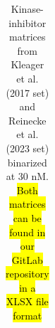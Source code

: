 \clearpage
\begin{table}[ht]
    \centering
    \caption{Kinase-inhibitor matrices from Kleager et al. (2017 set)\cite{klaeger_target_2017} and Reinecke et al. (2023 set)\cite{reinecke_chemical_2023} binarized at 30 nM. \hl{Both matrices can be found in our GitLab repository in a XLSX file format}}
    \label{PocketVec_TableS2}
    \begin{tabular}{|c|c|c|c|}
    \end{tabular}
\end{table}